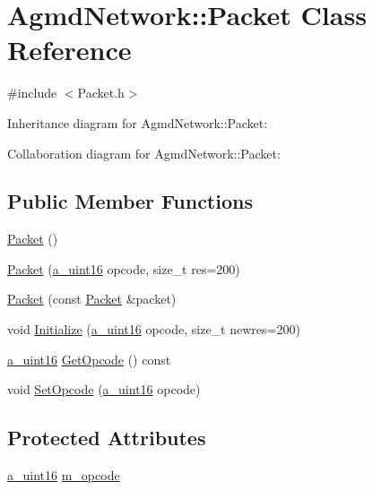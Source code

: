 \hypertarget{class_agmd_network_1_1_packet}{\section{Agmd\+Network\+:\+:Packet Class Reference}
\label{class_agmd_network_1_1_packet}
}


{\ttfamily \#include $<$Packet.\+h$>$}



Inheritance diagram for Agmd\+Network\+:\+:Packet\+:


Collaboration diagram for Agmd\+Network\+:\+:Packet\+:
\subsection*{Public Member Functions}
\begin{DoxyCompactItemize}
\item 
\hyperlink{class_agmd_network_1_1_packet_af499377e77dd1a35a7a76f5b48996725}{Packet} ()
\item 
\hyperlink{class_agmd_network_1_1_packet_a5eac77c0bb474bc5a6d36c02e471fefb}{Packet} (\hyperlink{_common_defines_8h_a7e7afab9b2de210021aed9953c6b367f}{a\+\_\+uint16} opcode, size\+\_\+t res=200)
\item 
\hyperlink{class_agmd_network_1_1_packet_a88cb2551f2eb849869ec44f3ba4df23b}{Packet} (const \hyperlink{class_agmd_network_1_1_packet}{Packet} \&packet)
\item 
void \hyperlink{class_agmd_network_1_1_packet_af629110ff49c84bf8e3c57c800e31fec}{Initialize} (\hyperlink{_common_defines_8h_a7e7afab9b2de210021aed9953c6b367f}{a\+\_\+uint16} opcode, size\+\_\+t newres=200)
\item 
\hyperlink{_common_defines_8h_a7e7afab9b2de210021aed9953c6b367f}{a\+\_\+uint16} \hyperlink{class_agmd_network_1_1_packet_a4b7d742e39bae80008380be6e4a51dc0}{Get\+Opcode} () const 
\item 
void \hyperlink{class_agmd_network_1_1_packet_a0717ff71886722e606b4c9feef5c0d6d}{Set\+Opcode} (\hyperlink{_common_defines_8h_a7e7afab9b2de210021aed9953c6b367f}{a\+\_\+uint16} opcode)
\end{DoxyCompactItemize}
\subsection*{Protected Attributes}
\begin{DoxyCompactItemize}
\item 
\hyperlink{_common_defines_8h_a7e7afab9b2de210021aed9953c6b367f}{a\+\_\+uint16} \hyperlink{class_agmd_network_1_1_packet_abf0dd089350b6fa9ee036f7807af5139}{m\+\_\+opcode}
\end{DoxyCompactItemize}
